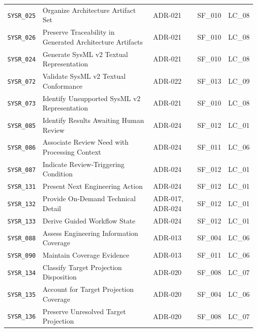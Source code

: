 \begin{xltabular}{\textwidth}{@{}p{1.65cm}X p{2.25cm}p{2.0cm}p{1.7cm}@{}}
\texttt{SYSR\_025} & Organize Architecture Artifact Set & ADR-021 & SF\_010 & LC\_08\\

\texttt{SYSR\_026} & Preserve Traceability in Generated Architecture Artifacts & ADR-021 & SF\_010 & LC\_08\\

\texttt{SYSR\_024} & Generate SysML v2 Textual Representation & ADR-021 & SF\_010 & LC\_08\\

\texttt{SYSR\_072} & Validate SysML v2 Textual Conformance & ADR-022 & SF\_013 & LC\_09\\

\texttt{SYSR\_073} & Identify Unsupported SysML v2 Representation & ADR-021 & SF\_010 & LC\_08\\

\texttt{SYSR\_085} & Identify Results Awaiting Human Review & ADR-024 & SF\_012 & LC\_01\\

\texttt{SYSR\_086} & Associate Review Need with Processing Context & ADR-024 & SF\_011 & LC\_06\\

\texttt{SYSR\_087} & Indicate Review-Triggering Condition & ADR-024 & SF\_012 & LC\_01\\

\texttt{SYSR\_131} & Present Next Engineering Action & ADR-024 & SF\_012 & LC\_01\\

\texttt{SYSR\_132} & Provide On-Demand Technical Detail & ADR-017, ADR-024 & SF\_012 & LC\_01\\

\texttt{SYSR\_133} & Derive Guided Workflow State & ADR-024 & SF\_012 & LC\_01\\

\texttt{SYSR\_088} & Assess Engineering Information Coverage & ADR-013 & SF\_004 & LC\_06\\

\texttt{SYSR\_090} & Maintain Coverage Evidence & ADR-013 & SF\_011 & LC\_06\\

\texttt{SYSR\_134} & Classify Target Projection Disposition & ADR-020 & SF\_008 & LC\_07\\

\texttt{SYSR\_135} & Account for Target Projection Coverage & ADR-020 & SF\_004 & LC\_06\\

\texttt{SYSR\_136} & Preserve Unresolved Target Projection & ADR-020 & SF\_008 & LC\_07\\


\end{xltabular}
